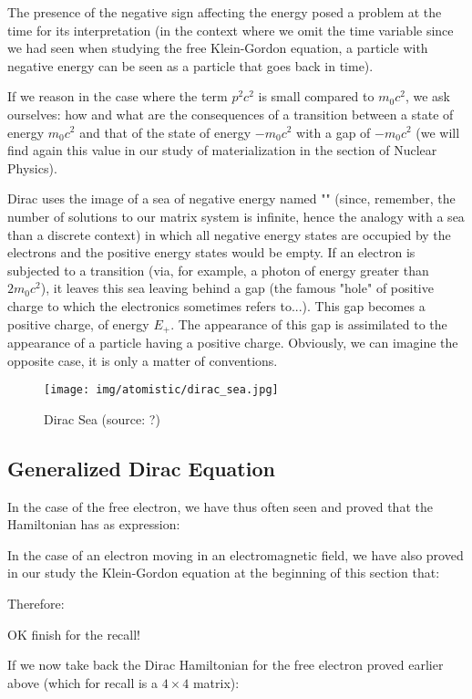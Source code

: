 	The presence of the negative sign affecting the energy posed a problem at the time for its interpretation (in the context where we omit the time variable since we had seen when studying the free Klein-Gordon equation, a particle with negative energy can be seen as a particle that goes back in time).

	If we reason in the case where the term $p^2c^2$ is small compared to $m_0c^2$, we ask ourselves: how and what are the consequences of a transition between a state of energy $m_0c^2$ and that of the state of energy $-m_0c^2$ with a gap of $-m_0c^2$ (we will find again this value in our study of materialization in the section of Nuclear Physics).

	Dirac uses the image of a sea of negative energy named "" (since, remember, the number of solutions to our matrix system is infinite, hence the analogy with a sea than a discrete context) in which all negative energy states are occupied by the electrons and the positive energy states would be empty. If an electron is subjected to a transition (via, for example, a photon of energy greater than $2m_0c^2$), it leaves this sea leaving behind a gap (the famous "hole" of positive charge to which the electronics sometimes refers to...). This gap becomes a positive charge, of energy $E_{+}$. The appearance of this gap is assimilated to the appearance of a particle having a positive charge. Obviously, we can imagine the opposite case, it is only a matter of conventions.
	\begin{figure}[H]
		\centering
		\texttt{[image: img/atomistic/dirac\_sea.jpg]}	
		\caption[Dirac Sea]{Dirac Sea (source: ?)}
	\end{figure}
	
	\pagebreak
	\subsection{Generalized Dirac Equation}
	In the case of the free electron, we have thus often seen and proved that the Hamiltonian has as expression:
	
	In the case of an electron moving in an electromagnetic field, we have also proved in our study the Klein-Gordon equation at the beginning of this section that:
	
	Therefore:
	
	OK finish for the recall!
	
	If we now take back the Dirac Hamiltonian for the free electron proved earlier above (which for recall is a $4\times 4$ matrix):
	

